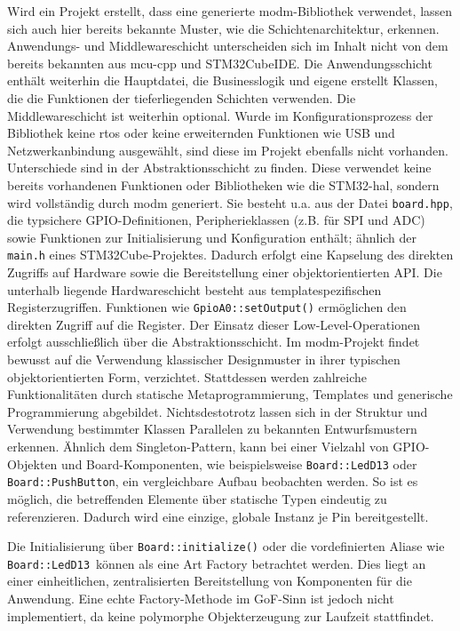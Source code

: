 Wird ein Projekt erstellt, dass eine generierte modm-Bibliothek verwendet, lassen sich auch hier bereits bekannte Muster, wie die Schichtenarchitektur, erkennen.
Anwendungs- und Middlewareschicht unterscheiden sich im Inhalt nicht von dem bereits bekannten aus mcu-cpp und STM32CubeIDE.
Die Anwendungsschicht enthält weiterhin die Hauptdatei, die Businesslogik und eigene erstellt Klassen, die die Funktionen der tieferliegenden Schichten verwenden.
Die Middlewareschicht ist weiterhin optional.
Wurde im Konfigurationsprozess der Bibliothek keine \gls{rtos} oder keine erweiternden Funktionen wie USB und Netzwerkanbindung ausgewählt, sind diese im Projekt ebenfalls nicht vorhanden.
Unterschiede sind in der Abstraktionsschicht zu finden.
Diese verwendet keine bereits vorhandenen Funktionen oder Bibliotheken wie die STM32-\gls{hal}, sondern wird vollständig durch modm generiert.
Sie besteht u.a. aus der Datei \texttt{board.hpp}, die typsichere GPIO-Definitionen, Peripherieklassen (z.B. für SPI und ADC) sowie Funktionen zur Initialisierung und Konfiguration enthält; ähnlich der \texttt{main.h} eines STM32Cube-Projektes.
Dadurch erfolgt eine Kapselung des direkten Zugriffs auf Hardware sowie die Bereitstellung einer objektorientierten API.
Die unterhalb liegende Hardwareschicht besteht aus templatespezifischen Registerzugriffen. 
Funktionen wie \texttt{GpioA0::setOutput()} ermöglichen den direkten Zugriff auf die Register. 
Der Einsatz dieser Low-Level-Operationen erfolgt ausschließlich über die Abstraktionsschicht.
Im modm-Projekt findet bewusst auf die Verwendung klassischer Designmuster in ihrer typischen objektorientierten Form, verzichtet. 
Stattdessen werden zahlreiche Funktionalitäten durch statische Metaprogrammierung, Templates und generische Programmierung abgebildet. 
Nichtsdestotrotz lassen sich in der Struktur und Verwendung bestimmter Klassen Parallelen zu bekannten Entwurfsmustern erkennen.
Ähnlich dem Singleton-Pattern, kann bei einer Vielzahl von GPIO-Objekten und Board-Komponenten, wie beispielsweise \texttt{Board::LedD13} oder \texttt{Board::PushButton}, ein vergleichbare Aufbau beobachten werden.
So ist es möglich, die betreffenden Elemente über statische Typen eindeutig zu referenzieren. 
Dadurch wird eine einzige, globale Instanz je Pin bereitgestellt.

Die Initialisierung über \texttt{Board::initialize()} oder die vordefinierten Aliase wie \texttt{Board::LedD13} können als eine Art Factory betrachtet werden. 
Dies liegt an einer einheitlichen, zentralisierten Bereitstellung von Komponenten für die Anwendung.
Eine echte Factory-Methode im GoF-Sinn ist jedoch nicht implementiert, da keine polymorphe Objekterzeugung zur Laufzeit stattfindet.

